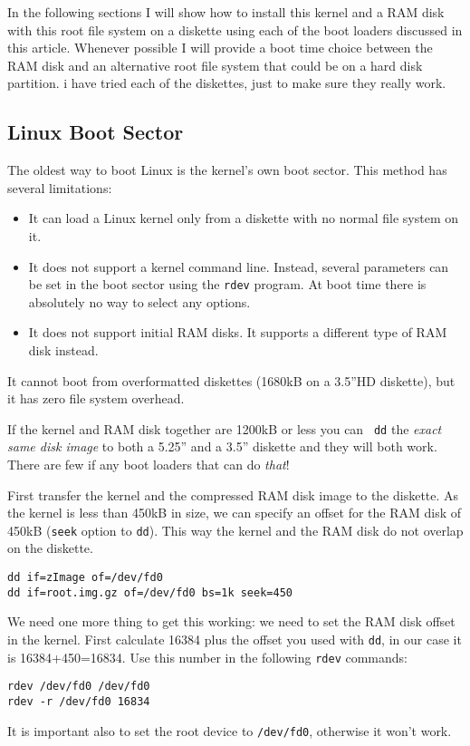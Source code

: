 \documentclass[12pt,a4paper]{article}
\begin{document}
In the following sections I will show how to install this kernel and a
RAM disk with this root file system on a diskette using each of the
boot loaders discussed in this article. Whenever possible I will
provide a boot time choice between the RAM disk and an alternative
root file system that could be on a hard disk partition. i have tried
each of the diskettes, just to make sure they really work.

\subsection{Linux Boot Sector}

\label{lbssect}
The oldest way to boot Linux is the kernel's own boot sector. This
method has several limitations:
\begin{itemize}
\item It can load a Linux kernel only from a diskette with no normal
  file system on it.
\item It does not support a kernel command line. Instead, several
  parameters can be set in the boot sector using the {\tt rdev}
  program. At boot time there is absolutely no way to select any
  options.
\item It does not support initial RAM disks. It supports a different
  type of RAM disk instead.
\end{itemize}

It cannot boot from overformatted diskettes (1680kB on a 3.5''HD
diskette), but it has zero file system overhead. 

If the kernel and RAM disk together are 1200kB or less you can {\tt
dd} the {\em exact same disk image} to both a 5.25'' and a 3.5'' diskette
and they will both work.  There are few if any boot loaders that can
do {\em that}!

First transfer the kernel and the compressed RAM disk image to the
diskette. As the kernel is less than 450kB in size, we can specify an
offset for the RAM disk of 450kB ({\tt seek} option to {\tt dd}). This
way the kernel and the RAM disk do not overlap on the diskette.
\begin{verbatim}
dd if=zImage of=/dev/fd0
dd if=root.img.gz of=/dev/fd0 bs=1k seek=450
\end{verbatim}

We need one more thing to get this working: we need to set the RAM
disk offset in the kernel. First calculate 16384 plus the offset you
used with {\tt dd}, in our case it is 16384+450=16834. Use this
number in the following {\tt rdev} commands:
\begin{verbatim}
rdev /dev/fd0 /dev/fd0
rdev -r /dev/fd0 16834 
\end{verbatim}
It is important also to set the root device to {\tt /dev/fd0},
otherwise it won't work.
\end{document}
